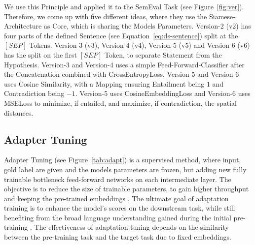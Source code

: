 We use this Principle and applied it to the SemEval Task (see Figure~\ref{fig:ver}). 
Therefore, we come up with five different ideas, where they use the Siamese-Architecture as Core, 
which is sharing the Models Parameters. Version-2 (v2) has four
parts of the defined Sentence (see Equation~\ref{eq:ds-sentence}) split at the $[SEP]$ Tokens.
Version-3 (v3), Version-4 (v4), Version-5 (v5) and Version-6 (v6) has the split on the first $[SEP]$ Token, to separate Statement from the Hypothesis.
Version-3 and Version-4 uses a simple Feed-Forward-Classifier after the Concatenation combined with CrossEntropyLoss.
Version-5 and Version-6 uses Cosine Similarity, with a Mapping ensuring Entailment being $1$ and
Contradiction being $-1$. Version-5 uses CosineEmbeddingLoss and Version-6 uses MSELoss to 
minimize, if entailed, and maximize, if contradiction, the spatial distances.


















\subsection{Adapter Tuning}\label{ch:adapter}

Adapter Tuning (see Figure~\ref{tab:adapt}) is a supervised method, where input, gold label are given and the models parameters are frozen, 
but adding new fully trainable bottleneck feed-forward networks 
on each intermediate layer. The objective is to reduce the size of trainable parameters, 
to gain higher throughput and keeping the pre-trained embeddings\cite{zheng_learn_2023} \cite{naveed_comprehensive_2023}. 
The ultimate goal of adaptation training is to enhance the model's scores on the downstream task, 
while still benefiting from the broad language understanding gained during the initial 
pre-training \cite{manjavacas_adapting_2022}. The effectiveness of adaptation-tuning depends on 
the similarity between the pre-training task and the target task due to fixed embeddings.

